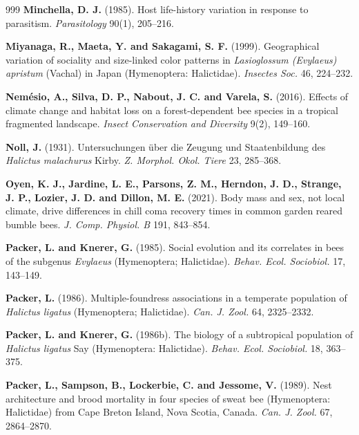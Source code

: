 \documentclass[11pt,a4paper]{article}
\begin{document}
\begin{thebibliography}{999}
\textbf{Minchella, D. J.} (1985).
Host life-history variation in response to parasitism.
\textit{Parasitology} 90(1), 205--216.

\textbf{Miyanaga, R., Maeta, Y. and Sakagami, S. F.} (1999). Geographical variation of sociality and size-linked color patterns in \textit{Lasioglossum (Evylaeus) apristum} (Vachal) in Japan (Hymenoptera: Halictidae). \textit{Insectes Soc.} 46, 224--232.

\textbf{Nemésio, A., Silva, D. P., Nabout, J. C. and Varela, S.} (2016).
Effects of climate change and habitat loss on a forest-dependent bee species in a tropical fragmented landscape.
\textit{Insect Conservation and Diversity} 9(2), 149--160.

\textbf{Noll, J.} (1931). Untersuchungen über die Zeugung und Staatenbildung des \textit{Halictus malachurus} Kirby. \textit{Z. Morphol. Okol. Tiere} 23, 285--368.

\textbf{Oyen, K. J., Jardine, L. E., Parsons, Z. M., Herndon, J. D., Strange, J. P., Lozier, J. D. and Dillon, M. E.} (2021).
Body mass and sex, not local climate, drive differences in chill coma recovery times in common garden reared bumble bees.
\textit{J. Comp. Physiol. B} 191, 843--854.

\textbf{Packer, L. and Knerer, G.} (1985). Social evolution and its correlates in bees of the subgenus \textit{Evylaeus} (Hymenoptera; Halictidae). \textit{Behav. Ecol. Sociobiol.} 17, 143--149.

\textbf{Packer, L.} (1986). Multiple-foundress associations in a temperate population of \textit{Halictus ligatus} (Hymenoptera; Halictidae). \textit{Can. J. Zool.} 64, 2325--2332.

\textbf{Packer, L. and Knerer, G.} (1986b).
The biology of a subtropical population of \textit{Halictus ligatus} Say (Hymenoptera: Halictidae).
\textit{Behav. Ecol. Sociobiol.} 18, 363--375.

\textbf{Packer, L., Sampson, B., Lockerbie, C. and Jessome, V.} (1989).
Nest architecture and brood mortality in four species of sweat bee (Hymenoptera: Halictidae) from Cape Breton Island, Nova Scotia, Canada.
\textit{Can. J. Zool.} 67, 2864--2870.


\end{thebibliography}
\end{document}

